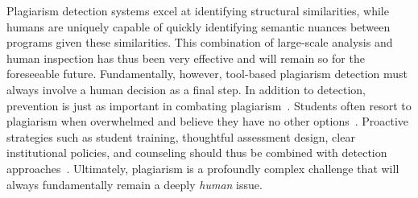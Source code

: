 Plagiarism detection systems excel at identifying structural similarities, while humans are uniquely capable of quickly identifying semantic nuances between programs given these similarities. This combination of large-scale analysis and human inspection has thus been very effective and will remain so for the foreseeable future. Fundamentally, however, tool-based plagiarism detection must always involve a human decision as a final step.
In addition to detection, prevention is just as important in combating plagiarism~\cite{Simon2016, Fincher2019}. Students often resort to plagiarism when overwhelmed and believe they have no other options~\cite{Amigud2019}.
Proactive strategies such as student training, thoughtful assessment design, clear institutional policies, and counseling should thus be combined with detection approaches~\cite{Lancaster2023}.
%
Ultimately, plagiarism is a profoundly complex challenge that will always fundamentally remain a deeply \textit{human} issue.
